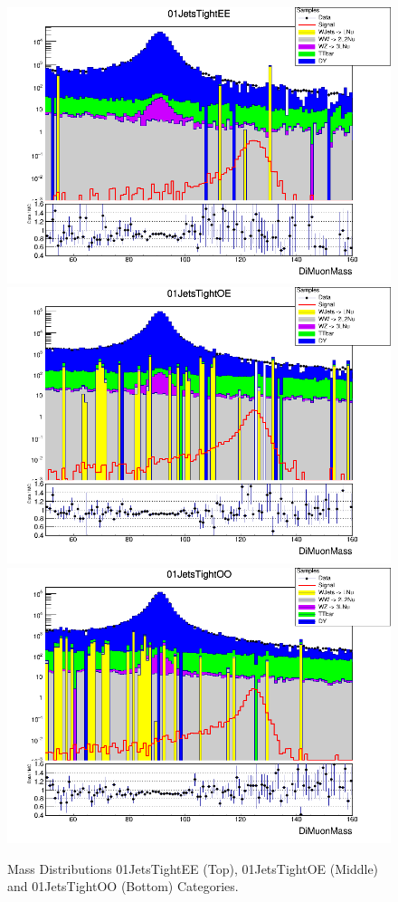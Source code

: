 \begin{figure}[H]
  \centering
  \includegraphics[width=0.65\linewidth]{figures/ch_higgs/distributions/baseline_kalman/distribution__01JetsTightEE__DiMuonMass__logY.png}\\
  \includegraphics[width=0.65\linewidth]{figures/ch_higgs/distributions/baseline_kalman/distribution__01JetsTightOE__DiMuonMass__logY.png}\\
  \includegraphics[width=0.65\linewidth]{figures/ch_higgs/distributions/baseline_kalman/distribution__01JetsTightOO__DiMuonMass__logY.png}
  \caption{Mass Distributions 01JetsTightEE (Top), 01JetsTightOE (Middle) and 01JetsTightOO (Bottom) Categories.}
  \label{fig:higgs_categorization_01jetstighteeeooo}
\end{figure}
